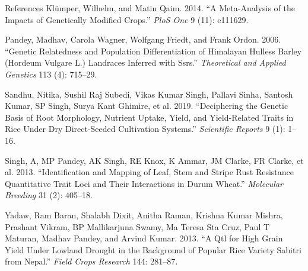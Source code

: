 \documentclass[
  ignorenonframetext,
  aspectratio=169]{beamer}
\newlength{\cslhangindent}
\newenvironment{cslreferences}%
  {\setlength{\parindent}{0pt}%
  \everypar{\setlength{\hangindent}{\cslhangindent}}\ignorespaces}%
  {\par}
\begin{document}
\begin{frame}{References}
\protect\hypertarget{references}{}
\hypertarget{refs}{}
\begin{cslreferences}
\leavevmode\hypertarget{ref-klumper2014meta}{}%
Klümper, Wilhelm, and Matin Qaim. 2014. ``A Meta-Analysis of the Impacts
of Genetically Modified Crops.'' \emph{PloS One} 9 (11): e111629.

\leavevmode\hypertarget{ref-pandey2006genetic}{}%
Pandey, Madhav, Carola Wagner, Wolfgang Friedt, and Frank Ordon. 2006.
``Genetic Relatedness and Population Differentiation of Himalayan
Hulless Barley (Hordeum Vulgare L.) Landraces Inferred with Ssrs.''
\emph{Theoretical and Applied Genetics} 113 (4): 715--29.

\leavevmode\hypertarget{ref-sandhu2019deciphering}{}%
Sandhu, Nitika, Sushil Raj Subedi, Vikas Kumar Singh, Pallavi Sinha,
Santosh Kumar, SP Singh, Surya Kant Ghimire, et al. 2019. ``Deciphering
the Genetic Basis of Root Morphology, Nutrient Uptake, Yield, and
Yield-Related Traits in Rice Under Dry Direct-Seeded Cultivation
Systems.'' \emph{Scientific Reports} 9 (1): 1--16.

\leavevmode\hypertarget{ref-singh2013identification}{}%
Singh, A, MP Pandey, AK Singh, RE Knox, K Ammar, JM Clarke, FR Clarke,
et al. 2013. ``Identification and Mapping of Leaf, Stem and Stripe Rust
Resistance Quantitative Trait Loci and Their Interactions in Durum
Wheat.'' \emph{Molecular Breeding} 31 (2): 405--18.

\leavevmode\hypertarget{ref-yadaw2013qtl}{}%
Yadaw, Ram Baran, Shalabh Dixit, Anitha Raman, Krishna Kumar Mishra,
Prashant Vikram, BP Mallikarjuna Swamy, Ma Teresa Sta Cruz, Paul T
Maturan, Madhav Pandey, and Arvind Kumar. 2013. ``A Qtl for High Grain
Yield Under Lowland Drought in the Background of Popular Rice Variety
Sabitri from Nepal.'' \emph{Field Crops Research} 144: 281--87.
\end{cslreferences}
\end{frame}
\end{document}
